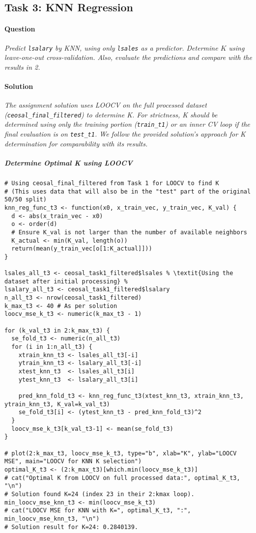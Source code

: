 \documentclass[12pt,a4paper]{article}
\newcommand{\Rcode}[1]{\texttt{#1}} %
\begin{document}
    \subsection{Task 3: KNN Regression}
        \paragraph{Question}
        \textit{Predict \Rcode{lsalary} by KNN, using only \Rcode{lsales} as a predictor. Determine $K$ using leave-one-out cross-validation. Also, evaluate the predictions and compare with the results in 2.}
        \paragraph{Solution}
            \textit{The assignment solution uses LOOCV on the full processed dataset (\Rcode{ceosal\_final\_filtered}) to determine K. For strictness, K should be determined using only the training portion (\Rcode{train\_t1}) or an inner CV loop if the final evaluation is on \Rcode{test\_t1}. We follow the provided solution's approach for K determination for comparability with its results.}
            \subparagraph{Determine Optimal K using LOOCV}
\begin{lstlisting}
# Using ceosal_final_filtered from Task 1 for LOOCV to find K
# (This uses data that will also be in the "test" part of the original 50/50 split)
knn_reg_func_t3 <- function(x0, x_train_vec, y_train_vec, K_val) {
  d <- abs(x_train_vec - x0)
  o <- order(d)
  # Ensure K_val is not larger than the number of available neighbors
  K_actual <- min(K_val, length(o))
  return(mean(y_train_vec[o[1:K_actual]]))
}

lsales_all_t3 <- ceosal_task1_filtered$lsales % \textit{Using the dataset after initial processing} %
lsalary_all_t3 <- ceosal_task1_filtered$lsalary
n_all_t3 <- nrow(ceosal_task1_filtered)
k_max_t3 <- 40 # As per solution
loocv_mse_k_t3 <- numeric(k_max_t3 - 1) 

for (k_val_t3 in 2:k_max_t3) {
  se_fold_t3 <- numeric(n_all_t3)
  for (i in 1:n_all_t3) {
    xtrain_knn_t3 <- lsales_all_t3[-i]
    ytrain_knn_t3 <- lsalary_all_t3[-i]
    xtest_knn_t3  <- lsales_all_t3[i]
    ytest_knn_t3  <- lsalary_all_t3[i]
    
    pred_knn_fold_t3 <- knn_reg_func_t3(xtest_knn_t3, xtrain_knn_t3, ytrain_knn_t3, K_val=k_val_t3)
    se_fold_t3[i] <- (ytest_knn_t3 - pred_knn_fold_t3)^2
  }
  loocv_mse_k_t3[k_val_t3-1] <- mean(se_fold_t3)
}

# plot(2:k_max_t3, loocv_mse_k_t3, type="b", xlab="K", ylab="LOOCV MSE", main="LOOCV for KNN K selection")
optimal_K_t3 <- (2:k_max_t3)[which.min(loocv_mse_k_t3)]
# cat("Optimal K from LOOCV on full processed data:", optimal_K_t3, "\n") 
# Solution found K=24 (index 23 in their 2:kmax loop).
min_loocv_mse_knn_t3 <- min(loocv_mse_k_t3)
# cat("LOOCV MSE for KNN with K=", optimal_K_t3, ":", min_loocv_mse_knn_t3, "\n")
# Solution result for K=24: 0.2840139.
\end{lstlisting}
\end{document}
